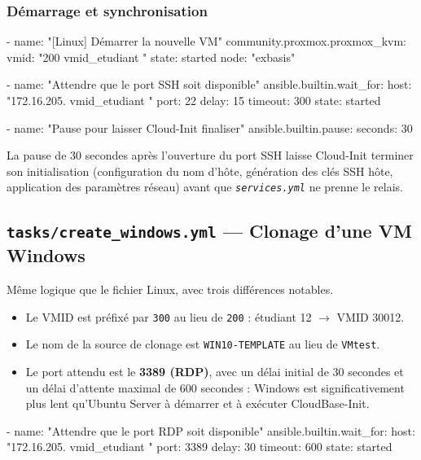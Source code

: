 \documentclass[a4paper]{article}
\newcommand{\cmd}[1]{\texttt{#1}}
\newcommand{\file}[1]{\texttt{\textit{#1}}}
\begin{document}
\subsubsection*{Démarrage et synchronisation}

\begin{yamlcode}
- name: "[Linux] Démarrer la nouvelle VM"
  community.proxmox.proxmox_kvm:
    vmid:  "200{{ vmid_etudiant }}"
    state: started
    node:  "exbasis"

- name: "Attendre que le port SSH soit disponible"
  ansible.builtin.wait_for:
    host:    "172.16.205.{{ vmid_etudiant }}"
    port:    22
    delay:   15
    timeout: 300
    state:   started

- name: "Pause pour laisser Cloud-Init finaliser"
  ansible.builtin.pause:
    seconds: 30
\end{yamlcode}

La pause de 30 secondes après l'ouverture du port SSH laisse Cloud-Init terminer son initialisation (configuration du nom d'hôte, génération des clés SSH hôte, application des paramètres réseau) avant que \file{services.yml} ne prenne le relais.

\subsection{\texttt{tasks/create\_windows.yml} --- Clonage d'une VM Windows}

Même logique que le fichier Linux, avec trois différences notables.

\begin{itemize}
  \item Le VMID est préfixé par \cmd{300} au lieu de \cmd{200} : étudiant 12 \(\to\) VMID 30012.
  \item Le nom de la source de clonage est \cmd{WIN10-TEMPLATE} au lieu de \cmd{VMtest}.
  \item Le port attendu est le \textbf{3389 (RDP)}, avec un délai initial de 30 secondes et un délai d'attente maximal de 600 secondes : Windows est significativement plus lent qu'Ubuntu Server à démarrer et à exécuter CloudBase-Init.
\end{itemize}

\begin{yamlcode}
- name: "Attendre que le port RDP soit disponible"
  ansible.builtin.wait_for:
    host:    "172.16.205.{{ vmid_etudiant }}"
    port:    3389
    delay:   30
    timeout: 600
    state:   started
\end{yamlcode}
\end{document}
